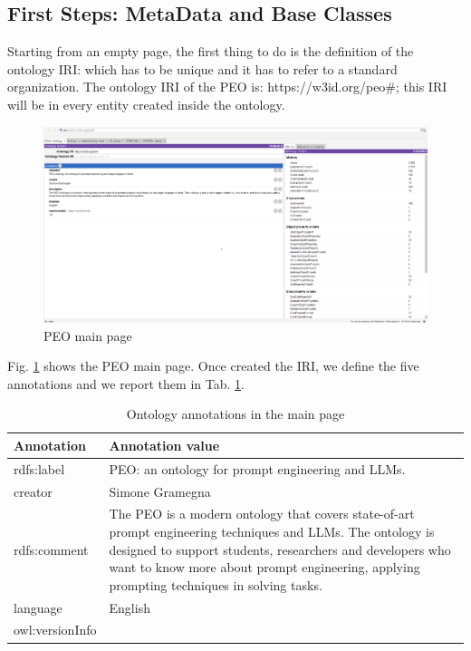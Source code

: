 \subsection{First Steps: MetaData and Base Classes}
\label{subsection:4_3_2_encoding}
Starting from an empty page, the first thing to do is the definition of the ontology IRI: which has to be unique and it has to refer to a standard organization.
The ontology IRI of the PEO is: https://w3id.org/peo\#; this IRI will be in every entity created inside the ontology.
\begin{figure}[H]
    \centering
    \includegraphics[width=0.8\linewidth]{Figures/fig_29.png}
    \caption{PEO main page}
    \label{fig:29}
\end{figure}
Fig. \ref{fig:29} shows the PEO main page.
Once created the IRI, we define the five annotations and we report them in Tab. \ref{table:t_4_1}. 
\begin{table}[H]
    \footnotesize 
    \centering
    \begin{tabular}{|>{\raggedright\arraybackslash}p{6cm}|>{\raggedright\arraybackslash}p{6cm}|}
        \hline
        Annotation & Annotation value \\ \hline
         rdfs:label & PEO: an ontology for prompt 
         engineering and LLMs. \\ \hline
         
         creator & Simone Gramegna\\ \hline
         
         rdfs:comment & The PEO is a modern ontology that covers state-of-art prompt engineering techniques and LLMs. The ontology is designed to support students, researchers and developers who want to know more about prompt engineering, applying prompting techniques in solving tasks. \\ \hline
         
         language & English \\ \hline
         
         owl:versionInfo & 1.0 \\ \hline
    \end{tabular}
    \caption{Ontology annotations in the main page}
    \label{table:t_4_1}
\end{table}


